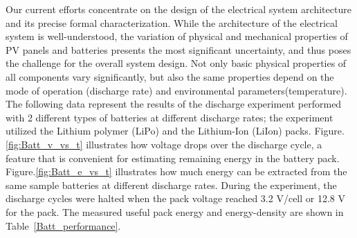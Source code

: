 \documentclass{ifacconf}
\begin{document}
Our current efforts concentrate on the design of the electrical system architecture and its precise formal characterization. While the architecture of the electrical system is well-understood, the variation of physical and mechanical properties of PV panels and batteries presents the most significant uncertainty, and thus poses the challenge for the overall system design. Not only basic physical properties of all components vary significantly, but also the same properties depend on the mode of operation (discharge rate) and environmental parameters(temperature). The following data represent the results of the discharge experiment performed with 2 different types of batteries at different discharge rates; the experiment utilized the Lithium polymer (LiPo) and the Lithium-Ion (LiIon) packs. Figure.\ref{fig:Batt_v_vs_t} illustrates how voltage drops over the discharge cycle, a feature that is convenient for estimating remaining energy in the battery pack. Figure.\ref{fig:Batt_e_vs_t} illustrates how much energy can be extracted from the same sample batteries at different discharge rates. During the experiment, the discharge cycles were halted when the pack voltage reached 3.2 V/cell or 12.8 V for the pack. The measured useful pack energy and energy-density are shown in Table~\ref{Batt_performance}.
\end{document}
